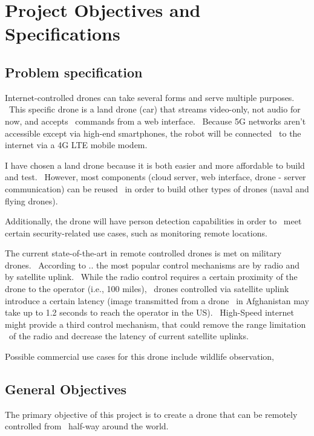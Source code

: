 

\chapter{Project Objectives and Specifications}
\label{ch:specification}

\section{Problem specification}
\label{sec:specification-specification}

Internet-controlled drones can take several forms and serve multiple purposes. \
This specific drone is a land drone (car) that streams video-only, not audio for now, and accepts \
commands from a web interface. \
Because 5G networks aren't accessible except via high-end smartphones, the robot will be connected \
to the internet via a 4G LTE mobile modem.

I have chosen a land drone because it is both easier and more affordable to build and test. \
However, most components (cloud server, web interface, drone - server communication) can be reused \
in order to build other types of drones (naval and flying drones).

Additionally, the drone will have person detection capabilities in order to \
meet certain security-related use cases, such as monitoring remote locations.

The current state-of-the-art in remote controlled drones is met on military drones. \
According to .. %
the most popular control mechanisms are by radio and by satellite uplink. \
While the radio control requires a certain proximity of the drone to the operator (i.e., 100 miles), \
drones controlled via satellite uplink introduce a certain latency (image transmitted from a drone \
in Afghanistan may take up to 1.2 seconds to reach the operator in the US). \
High-Speed internet might provide a third control mechanism, that could remove the range limitation \
of the radio and decrease the latency of current satellite uplinks.

Possible commercial use cases for this drone include wildlife observation,


\section{General Objectives}
\label{sec:specification-objectives}
The primary objective of this project is to create a drone that can be remotely controlled from \
half-way around the world.

